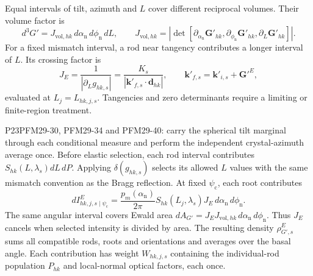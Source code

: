 Equal intervals of tilt, azimuth and $L$ cover different reciprocal volumes. Their volume factor is
\begin{equation}
 d^3G'=J_{\mathrm{vol},hk}\,d\alpha_{\mathrm n}\,d\phi_{\mathrm n}\,dL,
 \qquad
 J_{\mathrm{vol},hk}=\left|\det\left[
 \partial_{\alpha_{\mathrm n}}\mathbf G'_{hk},
 \partial_{\phi_{\mathrm n}}\mathbf G'_{hk},\partial_L\mathbf G'_{hk}\right]\right|.
 \label{eq:reciprocal_volume_measure_main}
\end{equation}
For a fixed mismatch interval, a rod near tangency contributes a longer interval of $L$. Its crossing factor is
\begin{equation}
 J_E=\frac{1}{|\partial_L g_{hk,s}|}
 =\frac{K_s}{|\mathbf k'_{f,s}\cdot\mathbf d_{hk}|},
 \qquad \mathbf k'_{f,s}=\mathbf k'_{i,s}+\mathbf G'^E,
  \label{eq:si_ewald_and_volume_jacobians}
\end{equation}
evaluated at $L_j=L_{hk,j,s}$. Tangencies and zero determinants require a limiting or finite-region treatment.
\begin{reviewchange}{P23}{PFM29-30, PFM29-34 and PFM29-40: carry the spherical tilt marginal through each conditional measure and perform the independent crystal-azimuth average once.}
Before elastic selection, each rod interval contributes $S_{hk}(L,\lambda_s)dL\,dP$. Applying $\delta(g_{hk,s})$ selects its allowed $L$ values with the same mismatch convention as the Bragg reflection. At fixed $\psi_{\mathrm c}$, each root contributes
\begin{equation}
  dI_{hk,j,s\mid{\psi_{\mathrm c}}}^{E}
  =\frac{p_m({\alpha_{\mathrm n}})}{2\pi}S_{hk}(L_j,\lambda_s)
   J_E\,d{\alpha_{\mathrm n}}\,d{\phi_{\mathrm n}}.
  \label{eq:si_ewald_selected_measure}
\end{equation}
The same angular interval covers Ewald area $dA_{G'}=J_EJ_{\mathrm{vol},hk}\,d\alpha_{\mathrm n}\,d\phi_{\mathrm n}$. Thus $J_E$ cancels when selected intensity is divided by area. The resulting density $\rho_{G',s}^E$ sums all compatible rods, roots and orientations and averages over the basal angle. Each contribution has weight $W_{hk,j,s}$ containing the individual-rod population $P_{hk}$ and local-normal optical factors, each once.
\end{reviewchange}

